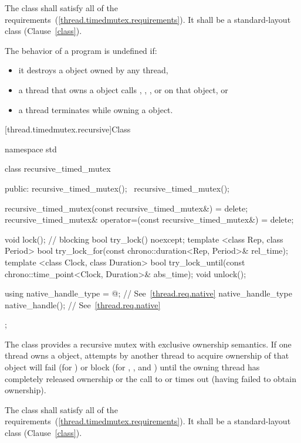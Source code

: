 \pnum
The class  shall satisfy all of the 
requirements~(\ref{thread.timedmutex.requirements}). It shall be a standard-layout
class (Clause~\ref{class}).

\pnum
The behavior of a program is undefined if:

\begin{itemize}
\item it destroys a  object owned by any thread,
\item a thread that owns a  object calls ,
, , or  on that object, or
\item a thread terminates while owning a  object.
\end{itemize}

[thread.timedmutex.recursive]{Class }

\begin{codeblock}
namespace std {
  class recursive_timed_mutex {
  public:
    recursive_timed_mutex();
    ~recursive_timed_mutex();

    recursive_timed_mutex(const recursive_timed_mutex&) = delete;
    recursive_timed_mutex& operator=(const recursive_timed_mutex&) = delete;

    void lock();  // blocking
    bool try_lock() noexcept;
    template <class Rep, class Period>
      bool try_lock_for(const chrono::duration<Rep, Period>& rel_time);
    template <class Clock, class Duration>
      bool try_lock_until(const chrono::time_point<Clock, Duration>& abs_time);
    void unlock();

    using native_handle_type = @\impdef@; // See~\ref{thread.req.native}
    native_handle_type native_handle();                // See~\ref{thread.req.native}
  };
}
\end{codeblock}

\pnum
The class  provides a recursive mutex with exclusive
ownership semantics. If one thread owns a  object,
attempts by another thread to acquire ownership of that object will fail (for
) or block (for , , and
) until the owning thread has completely released
ownership or the call to  or 
times out (having failed to obtain ownership).

\pnum
The class  shall satisfy all of the 
requirements~(\ref{thread.timedmutex.requirements}). It shall be a standard-layout
class (Clause~\ref{class}).

